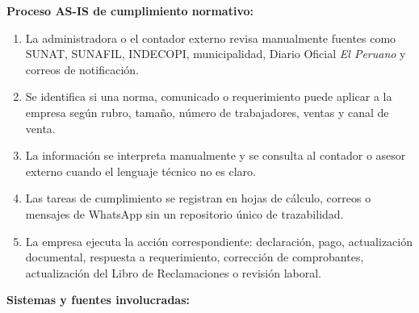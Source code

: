 \documentclass[12pt,a4paper,oneside]{report}
\begin{document}
\textbf{Proceso AS-IS de cumplimiento normativo:}

\begin{enumerate}
\item La administradora o el contador externo revisa manualmente fuentes como SUNAT, SUNAFIL, INDECOPI, municipalidad, Diario Oficial \textit{El Peruano} y correos de notificación.
\item Se identifica si una norma, comunicado o requerimiento puede aplicar a la empresa según rubro, tamaño, número de trabajadores, ventas y canal de venta.
\item La información se interpreta manualmente y se consulta al contador o asesor externo cuando el lenguaje técnico no es claro.
\item Las tareas de cumplimiento se registran en hojas de cálculo, correos o mensajes de WhatsApp sin un repositorio único de trazabilidad.
\item La empresa ejecuta la acción correspondiente: declaración, pago, actualización documental, respuesta a requerimiento, corrección de comprobantes, actualización del Libro de Reclamaciones o revisión laboral.
\end{enumerate}

\textbf{Sistemas y fuentes involucradas:}
\end{document}
